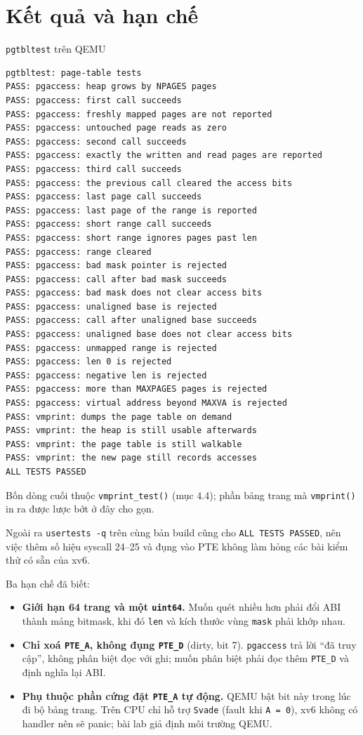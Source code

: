 \section{Kết quả và hạn chế}

\begin{codebox}[pgtbltest]{\texttt{pgtbltest} trên QEMU}
    \begin{verbatim}
pgtbltest: page-table tests
PASS: pgaccess: heap grows by NPAGES pages
PASS: pgaccess: first call succeeds
PASS: pgaccess: freshly mapped pages are not reported
PASS: pgaccess: untouched page reads as zero
PASS: pgaccess: second call succeeds
PASS: pgaccess: exactly the written and read pages are reported
PASS: pgaccess: third call succeeds
PASS: pgaccess: the previous call cleared the access bits
PASS: pgaccess: last page call succeeds
PASS: pgaccess: last page of the range is reported
PASS: pgaccess: short range call succeeds
PASS: pgaccess: short range ignores pages past len
PASS: pgaccess: range cleared
PASS: pgaccess: bad mask pointer is rejected
PASS: pgaccess: call after bad mask succeeds
PASS: pgaccess: bad mask does not clear access bits
PASS: pgaccess: unaligned base is rejected
PASS: pgaccess: call after unaligned base succeeds
PASS: pgaccess: unaligned base does not clear access bits
PASS: pgaccess: unmapped range is rejected
PASS: pgaccess: len 0 is rejected
PASS: pgaccess: negative len is rejected
PASS: pgaccess: more than MAXPAGES pages is rejected
PASS: pgaccess: virtual address beyond MAXVA is rejected
PASS: vmprint: dumps the page table on demand
PASS: vmprint: the heap is still usable afterwards
PASS: vmprint: the page table is still walkable
PASS: vmprint: the new page still records accesses
ALL TESTS PASSED
    \end{verbatim}
\end{codebox}

Bốn dòng cuối thuộc \texttt{vmprint\_test()} (mục 4.4); phần bảng trang mà \texttt{vmprint()} in ra được lược bớt ở đây cho gọn.

Ngoài ra \texttt{usertests -q} trên cùng bản build cũng cho \texttt{ALL TESTS PASSED}, nên việc thêm số hiệu syscall 24--25 và đụng vào PTE không làm hỏng các bài kiểm thử có sẵn của xv6.

Ba hạn chế đã biết:

\begin{itemize}[itemsep=0pt, topsep=2.5pt, leftmargin=1.5cm]
    \item \textbf{Giới hạn 64 trang và một \texttt{uint64}.} Muốn quét nhiều hơn phải đổi ABI thành mảng bitmask, khi đó \texttt{len} và kích thước vùng \texttt{mask} phải khớp nhau.
    \item \textbf{Chỉ xoá \texttt{PTE\_A}, không đụng \texttt{PTE\_D}} (dirty, bit 7). \texttt{pgaccess} trả lời ``đã truy cập'', không phân biệt đọc với ghi; muốn phân biệt phải đọc thêm \texttt{PTE\_D} và định nghĩa lại ABI.
    \item \textbf{Phụ thuộc phần cứng đặt \texttt{PTE\_A} tự động.} QEMU bật bit này trong lúc đi bộ bảng trang. Trên CPU chỉ hỗ trợ \texttt{Svade} (fault khi \texttt{A = 0}), xv6 không có handler nên sẽ panic; bài lab giả định môi trường QEMU.
\end{itemize}
